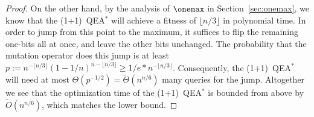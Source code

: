 \begin{proof}
On the other hand, by the analysis of $\onemax$ in Section~\ref{sec:onemax}, we know that the (1+1)~QEA$^*$ will achieve a fitness of $\lfloor n/3 \rfloor$ in polynomial time. In order to jump from this point to the maximum, it suffices to flip the remaining one-bits all at once, and leave the other bits unchanged. The probability that the mutation operator does this jump is at least $p:=n^{-\lfloor n/3\rfloor}(1-1/n)^{n-\lfloor n/3\rfloor} \geq 1/e * n^{-\lfloor n/3\rfloor} $. Consequently, the (1+1)~QEA$^*$
will need at most $\Theta(p^{-1/2}) =  \tilde{\Theta}(n^{n/6})$ many queries for the jump. Altogether we see that the optimization time of the (1+1)~QEA$^*$ is bounded from above by $\tilde{O}(n^{n/6})$, which matches the lower bound.


\end{proof}
